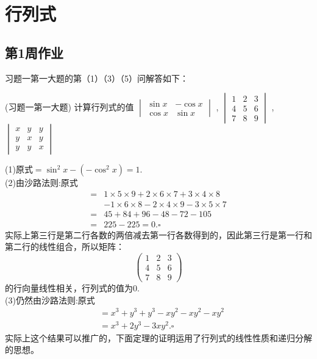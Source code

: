 \chapter{行列式}
\section{第1周作业}
习题一第一大题的第（1）（3）（5）问解答如下：
\begin{example}{(习题一第一大题)}{}
计算行列式的值
$\begin{vmatrix}
    \sin x & -\cos x \\
    \cos x & \sin x
\end{vmatrix}$
,
$\begin{vmatrix}
    1 & 2 & 3 \\
    4 & 5 & 6 \\
    7 & 8 & 9
\end{vmatrix}$
,
$\begin{vmatrix}
    x & y & y \\
    y & x & y \\
    y & y & x
\end{vmatrix}$
\end{example}
\begin{solution}{}{}
    (1)原式$=\sin^2x-(-\cos^2x)=1$.\\
    (2)由沙路法则:原式\vspace{-10pt}\\
    \vspace{-10pt}
    \begin{align*}
        =&1\times5\times9+2\times6\times7+3\times4\times8\\
        &-1\times6\times8-2\times4\times9-3\times5\times7\\
        =&45+84+96-48-72-105\\
        =&225-225=0.\square
    \end{align*}
    实际上第三行是第二行各数的两倍减去第一行各数得到的，因此第三行是第一行和第二行的线性组合，所以矩阵：
    \[
    \begin{pmatrix} 
        1 & 2 & 3 \\
        4 & 5 & 6 \\
        7 & 8 & 9
    \end{pmatrix}
    \]的行向量线性相关，行列式的值为0.\\
    (3)仍然由沙路法则:原式\vspace{=-10pt}
    \begin{align*}
        &=x^3+y^3+y^3-xy^2-xy^2-xy^2\\
        &=x^3+2y^3-3xy^2.\square
    \end{align*}
    实际上这个结果可以推广的，下面定理的证明运用了行列式的线性性质和递归分解的思想。
\end{solution}
